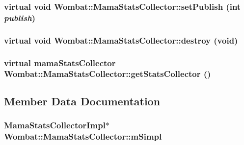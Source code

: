 \label{classWombat_1_1MamaStatsCollector_a5a10925f5788f4e1ffbbbfd9557e5dd7}
\hypertarget{classWombat_1_1MamaStatsCollector_a503e1008e55695191629420b7e81a5f1}{
\subsubsection[{setPublish}]{\setlength{\rightskip}{0pt plus 5cm}virtual void Wombat::MamaStatsCollector::setPublish (int {\em publish})}}
\label{classWombat_1_1MamaStatsCollector_a503e1008e55695191629420b7e81a5f1}
\hypertarget{classWombat_1_1MamaStatsCollector_a1436a070a73bd1e998065bfc4b164c37}{
\subsubsection[{destroy}]{\setlength{\rightskip}{0pt plus 5cm}virtual void Wombat::MamaStatsCollector::destroy (void)}}
\label{classWombat_1_1MamaStatsCollector_a1436a070a73bd1e998065bfc4b164c37}
\hypertarget{classWombat_1_1MamaStatsCollector_ad65e961d4ae9bdb95252cf141b406749}{
\subsubsection[{getStatsCollector}]{\setlength{\rightskip}{0pt plus 5cm}virtual mamaStatsCollector Wombat::MamaStatsCollector::getStatsCollector ()}}
\label{classWombat_1_1MamaStatsCollector_ad65e961d4ae9bdb95252cf141b406749}


\subsection{Member Data Documentation}
\hypertarget{classWombat_1_1MamaStatsCollector_ac451f4b0b0326f503b3301f7b89a9e36}{
\subsubsection[{mSimpl}]{\setlength{\rightskip}{0pt plus 5cm}MamaStatsCollectorImpl$\ast$ {\bf Wombat::MamaStatsCollector::mSimpl}}}
\label{classWombat_1_1MamaStatsCollector_ac451f4b0b0326f503b3301f7b89a9e36}

